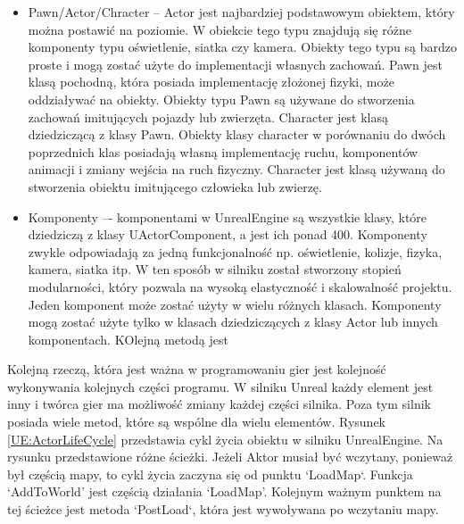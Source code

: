 \documentclass[12pt,twoside]{article}
\begin{document}
\begin{itemize}
\item Pawn/Actor/Chracter -- Actor jest najbardziej podstawowym obiektem, który
można postawić na poziomie. W obiekcie tego typu znajdują się różne komponenty
typu oświetlenie, siatka czy kamera. Obiekty tego typu są bardzo proste i mogą
zostać użyte do implementacji własnych zachowań. Pawn jest klasą pochodną, która
posiada implementację złożonej fizyki, może oddziaływać na obiekty. Obiekty typu
Pawn są używane do stworzenia zachowań imitujących pojazdy lub zwierzęta.
Character jest klasą dziedziczącą z klasy Pawn. Obiekty klasy character w
porównaniu do dwóch poprzednich klas posiadają własną implementację ruchu,
komponentów animacji i zmiany wejścia na ruch fizyczny. Character jest klasą
używaną do stworzenia obiektu imitującego człowieka lub zwierzę. 

\item Komponenty –- komponentami w UnrealEngine są wszystkie klasy, które
dziedziczą z klasy UActorComponent, a jest ich ponad 400. Komponenty zwykle
odpowiadają za jedną funkcjonalność np. oświetlenie, kolizje, fizyka, kamera,
siatka itp.  W ten sposób w silniku został stworzony stopień modularności, który
pozwala na wysoką elastyczność i skalowalność projektu. Jeden komponent może
zostać użyty w wielu różnych klasach. Komponenty mogą zostać użyte tylko w
klasach dziedziczących z klasy Actor lub innych komponentach. KOlejną metodą jest 


\end{itemize}

Kolejną rzeczą, która jest ważna w programowaniu gier jest kolejność wykonywania
kolejnych części programu. W silniku Unreal każdy element jest inny i twórca
gier ma możliwość zmiany każdej części silnika. Poza tym silnik posiada wiele
metod, które są wspólne dla wielu elementów. Rysunek \ref{UE:ActorLifeCycle}
przedstawia cykl życia obiektu w silniku UnrealEngine. Na rysunku przedstawione
różne ścieżki. Jeżeli Aktor musiał być wczytany, ponieważ był częścią mapy, to
cykl życia zaczyna się od punktu `LoadMap`. Funkcja ‘AddToWorld’ jest częścią
działania ‘LoadMap’. Kolejnym ważnym punktem na tej ścieżce jest metoda
`PostLoad`, która jest wywoływana po wczytaniu mapy. 
\end{document}
